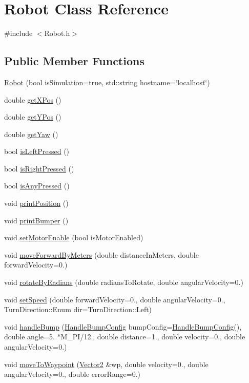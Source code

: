\hypertarget{classRobot}{}\section{Robot Class Reference}
\label{classRobot}


{\ttfamily \#include $<$Robot.\+h$>$}

\subsection*{Public Member Functions}
\begin{DoxyCompactItemize}
\item 
\hyperlink{classRobot_aadf13d050156f275c34eace9e6c3e782}{Robot} (bool is\+Simulation=true, std\+::string hostname=\char`\"{}localhost\char`\"{})
\item 
double \hyperlink{classRobot_a2f6aa9366def08eafe87f1d83d4cf1b7}{get\+X\+Pos} ()
\item 
double \hyperlink{classRobot_a60b83b42a3e08af931709a526632fb6d}{get\+Y\+Pos} ()
\item 
double \hyperlink{classRobot_a30cfb16f262020569b21780eecadf4ae}{get\+Yaw} ()
\item 
bool \hyperlink{classRobot_a3b33d92fbb96a9dc1c1eb7e2b776be38}{is\+Left\+Pressed} ()
\item 
bool \hyperlink{classRobot_acb4caaf0af89fd69fcc0396e79690a39}{is\+Right\+Pressed} ()
\item 
bool \hyperlink{classRobot_a71db47948a4fc61791ffa789033bfac4}{is\+Any\+Pressed} ()
\item 
void \hyperlink{classRobot_a64aeca7dab240ea7d56adf4de8448cba}{print\+Position} ()
\item 
void \hyperlink{classRobot_a04301aeae6bb441235a9020f2b214fbf}{print\+Bumper} ()
\item 
void \hyperlink{classRobot_ae59cdda4345c38cff6157f78a417b102}{set\+Motor\+Enable} (bool is\+Motor\+Enabled)
\item 
void \hyperlink{classRobot_a8cb45b5d6e8ede01ebe6996d7edcd093}{move\+Forward\+By\+Meters} (double distance\+In\+Meters, double forward\+Velocity=0.)
\item 
void \hyperlink{classRobot_a4e139756e0d56b718ff5c19daa7c5f57}{rotate\+By\+Radians} (double radians\+To\+Rotate, double angular\+Velocity=0.)
\item 
void \hyperlink{classRobot_a1135ca4f689f1d8354cb03c3a095934e}{set\+Speed} (double forward\+Velocity=0., double angular\+Velocity=0., Turn\+Direction\+::\+Enum dir=Turn\+Direction\+::\+Left)
\item 
void \hyperlink{classRobot_a1b6e28d4eba7ff9e911bd544e24e3f9b}{handle\+Bump} (\hyperlink{structHandleBumpConfig}{Handle\+Bump\+Config} bump\+Config=\hyperlink{structHandleBumpConfig}{Handle\+Bump\+Config}(), double angle=5. $\ast$M\+\_\+\+PI/12., double distance=1., double velocity=0., double angular\+Velocity=0.)
\item 
void \hyperlink{classRobot_a5c26029a55663078f1a00c2f7eec4e7b}{move\+To\+Waypoint} (\hyperlink{structVector2}{Vector2} \&wp, double velocity=0., double angular\+Velocity=0., double error\+Range=0.)
\end{DoxyCompactItemize}
